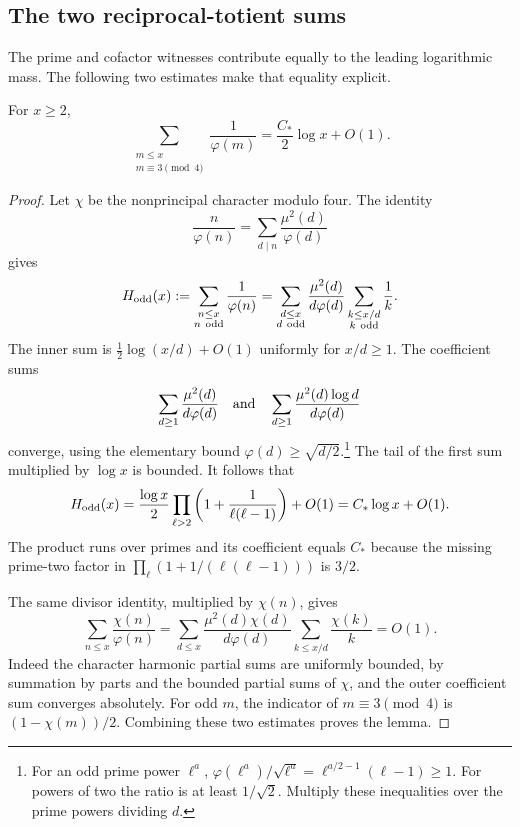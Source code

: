 \subsection{The two reciprocal-totient sums}
The prime and cofactor witnesses contribute equally to the leading
logarithmic mass. The following two estimates make that equality
explicit.

\begin{lemma}\label{lem:totient-three}
For $x\ge2$,
\[
 \sum_{\substack{m\le x\\m\equiv3\pmod4}}\frac1{\varphi(m)}
       =\frac{C_*}{2}\log x+O(1).
\]
\end{lemma}
\begin{proof}
Let $\chi$ be the nonprincipal character modulo four. The identity
\[
 \frac{n}{\varphi(n)}
   =\sum_{d\mid n}\frac{\mu^2(d)}{\varphi(d)}
\]
gives
\[
 H_{\rm odd}(x):=\sum_{\substack{n\le x\\n\ {\rm odd}}}
                      \frac1{\varphi(n)}
 =\sum_{\substack{d\le x\\d\ {\rm odd}}}
    \frac{\mu^2(d)}{d\varphi(d)}
    \sum_{\substack{k\le x/d\\k\ {\rm odd}}}\frac1k .
\]
The inner sum is $\frac12\log(x/d)+O(1)$ uniformly for $x/d\ge1$.
The coefficient sums
\[
 \sum_{d\ge1}\frac{\mu^2(d)}{d\varphi(d)}
 \quad\hbox{and}\quad
 \sum_{d\ge1}\frac{\mu^2(d)\log d}{d\varphi(d)}
\]
converge, using the elementary bound
$\varphi(d)\ge\sqrt{d/2}$.\footnote{For an odd prime power
$\ell^a$, $\varphi(\ell^a)/\sqrt{\ell^a}
=\ell^{a/2-1}(\ell-1)\ge1$.
For powers of two the ratio is at least $1/\sqrt2$.
Multiply these inequalities over the prime powers dividing $d$.}
The tail of the first sum multiplied by $\log x$
is bounded. It follows that
\[
 H_{\rm odd}(x)
 =\frac{\log x}{2}
   \prod_{\ell>2}\left(1+\frac1{\ell(\ell-1)}\right)+O(1)
 =C_*\log x+O(1).
\]
The product runs over primes and its coefficient equals $C_*$
because the missing prime-two factor in
$\prod_\ell(1+1/(\ell(\ell-1)))$ is $3/2$.

The same divisor identity, multiplied by $\chi(n)$, gives
\[
 \sum_{n\le x}\frac{\chi(n)}{\varphi(n)}
 =\sum_{d\le x}\frac{\mu^2(d)\chi(d)}{d\varphi(d)}
                \sum_{k\le x/d}\frac{\chi(k)}k=O(1).
\]
Indeed the character harmonic partial sums are uniformly bounded,
by summation by parts and the bounded partial sums of $\chi$,
and the outer coefficient sum converges absolutely.
For odd $m$, the indicator of $m\equiv3\pmod4$ is
$(1-\chi(m))/2$. Combining these two estimates proves the lemma.
\end{proof}

